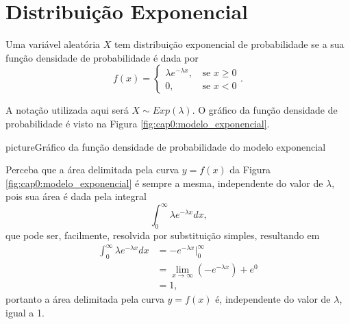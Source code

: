 \section{Distribuição Exponencial}

Uma variável aleatória $X$ tem distribuição exponencial de probabilidade se a sua função densidade de probabilidade é dada por
\[
	f(x)=\begin{cases}
		\lambda e^{-\lambda x}\text{,}&\text{ se }x\geqslant 0\\
		0\text{,}&\text{ se }x<0
	\end{cases}
	\text{.}
\]

A notação utilizada aqui será $X\sim Exp(\lambda)$. O gráfico da função densidade de probabilidade é visto na Figura \ref{fig:cap0:modelo_exponencial}.

\begin{sidepicture}{2cm}{picture}{Gráfico da função densidade de probabilidade do modelo exponencial}
	\label{fig:cap0:modelo_exponencial}
\end{sidepicture}

\begin{remark}
	Perceba que a área delimitada pela curva $y=f(x)$ da Figura \ref{fig:cap0:modelo_exponencial} é sempre a mesma, independente do valor de $\lambda$, pois sua área é dada pela integral
	\[
		\int_{0}^{\infty} \lambda e^{-\lambda x}dx
		\text{,}
	\]
	que pode ser, facilmente, resolvida por substituição simples, resultando em
	\begin{align*}
		\int_{0}^{\infty} \lambda e^{-\lambda x}dx &= -e^{-\lambda x}\Big|_{0}^{\infty}\\ 
													&= \lim_{x\to \infty} (-e^{-\lambda x}) + e^0\\
													&=1
		\text{,}
	\end{align*}
	portanto a área delimitada pela curva $y=f(x)$ é, independente do valor de $\lambda$, igual a 1.
\end{remark}

